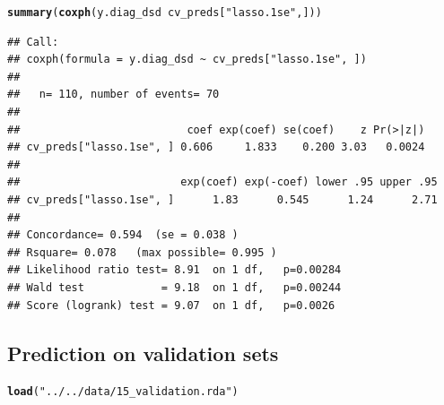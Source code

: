 \documentclass{article}\usepackage[]{graphicx}\usepackage[]{color}
\makeatletter
\newcommand{\hlstr}[1]{\textcolor[rgb]{0.192,0.494,0.8}{#1}}%
\newcommand{\hlopt}[1]{\textcolor[rgb]{0,0,0}{#1}}%
\newcommand{\hlstd}[1]{\textcolor[rgb]{0.345,0.345,0.345}{#1}}%
\newcommand{\hlkwd}[1]{\textcolor[rgb]{0.737,0.353,0.396}{\textbf{#1}}}%
\newenvironment{kframe}{%
 \def\at@end@of@kframe{}%
 \ifinner\ifhmode%
  \def\at@end@of@kframe{\end{minipage}}%
  \begin{minipage}{\columnwidth}%
 \fi\fi%
 \def\FrameCommand##1{\hskip\@totalleftmargin \hskip-\fboxsep
 \colorbox{shadecolor}{##1}\hskip-\fboxsep
     \hskip-\linewidth \hskip-\@totalleftmargin \hskip\columnwidth}%
 \MakeFramed {\advance\hsize-\width
   \@totalleftmargin\z@ \linewidth\hsize
   \@setminipage}}%
 {\par\unskip\endMakeFramed%
 \at@end@of@kframe}
\newenvironment{knitrout}{}{} %
\makeatother
\begin{document}
\begin{knitrout}
\color{fgcolor}\begin{kframe}
\begin{alltt}
\hlkwd{summary}\hlstd{(}\hlkwd{coxph}\hlstd{(y.diag_dsd} \hlopt{~} \hlstd{cv_preds[}\hlstr{"lasso.1se"}\hlstd{, ]))}
\end{alltt}
\begin{verbatim}
## Call:
## coxph(formula = y.diag_dsd ~ cv_preds["lasso.1se", ])
## 
##   n= 110, number of events= 70 
## 
##                          coef exp(coef) se(coef)    z Pr(>|z|)
## cv_preds["lasso.1se", ] 0.606     1.833    0.200 3.03   0.0024
## 
##                         exp(coef) exp(-coef) lower .95 upper .95
## cv_preds["lasso.1se", ]      1.83      0.545      1.24      2.71
## 
## Concordance= 0.594  (se = 0.038 )
## Rsquare= 0.078   (max possible= 0.995 )
## Likelihood ratio test= 8.91  on 1 df,   p=0.00284
## Wald test            = 9.18  on 1 df,   p=0.00244
## Score (logrank) test = 9.07  on 1 df,   p=0.0026
\end{verbatim}
\end{kframe}
\end{knitrout}


\subsection{Prediction on validation sets}
\begin{knitrout}
\color{fgcolor}\begin{kframe}
\begin{alltt}
\hlkwd{load}\hlstd{(}\hlstr{"../../data/15_validation.rda"}\hlstd{)}
\end{alltt}
\end{kframe}
\end{knitrout}
\end{document}
